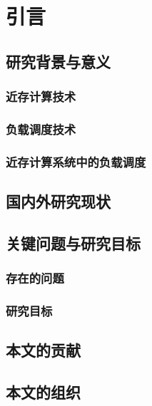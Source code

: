 \chapter{引言}\label{chap:Introduction}

  \section{研究背景与意义}\label{sec:background_and_motivation}
    \subsection{近存计算技术}\label{subsec:PNM_background}
    \subsection{负载调度技术}\label{subsec:task_scheduling_background}
    \subsection{近存计算系统中的负载调度}\label{subsec:task_scheduling_in_PNM_background}
  \section{国内外研究现状}\label{sec:related_researches}
  \section{关键问题与研究目标}\label{sec:problems_and_goals}
    \subsection{存在的问题}\label{subsec:existed_problems}
    \subsection{研究目标}\label{subsec:research_goals}
  \section{本文的贡献}\label{sec:contributions}
  \section{本文的组织}\label{sec:doc_organization}
